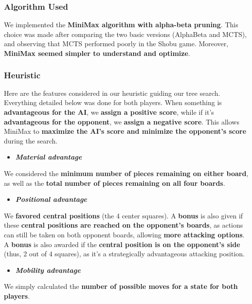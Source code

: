 \documentclass[11pt,a4paper]{report}
\begin{document}
\begin{answers}[21cm]
\subsubsection{Algorithm Used}
We implemented the \textbf{MiniMax algorithm with alpha-beta pruning}. This choice was made after comparing the two basic versions (AlphaBeta and MCTS), and observing that MCTS performed poorly in the Shobu game. Moreover, \textbf{MiniMax seemed simpler to understand and optimize}.

\subsubsection{Heuristic}

Here are the features considered in our heuristic guiding our tree search. Everything detailed below was done for both players. When something is \textbf{advantageous for the AI}, we \textbf{assign a positive score}, while if it's \textbf{advantageous for the opponent}, we \textbf{assign a negative score}. This allows MiniMax to \textbf{maximize the AI's score and minimize the opponent's score} during the search.

\begin{itemize}
    \item \textbf{\textit{Material advantage}}
\end{itemize}
We considered the \textbf{minimum number of pieces remaining on either board}, as well as the \textbf{total number of pieces remaining on all four boards}.

\begin{itemize}
    \item \textbf{\textit{Positional advantage}}
\end{itemize}
We \textbf{favored central positions} (the 4 center squares). A \textbf{bonus} is also given if these \textbf{central positions are reached on the opponent's boards}, as actions can still be taken on both opponent boards, allowing \textbf{more attacking options}. A \textbf{bonus} is also awarded if the \textbf{central position is on the opponent's side} (thus, 2 out of 4 squares), as it's a strategically advantageous attacking position.

\begin{itemize}
    \item \textbf{\textit{Mobility advantage}}
\end{itemize}
We simply calculated the \textbf{number of possible moves for a state for both players}.


\end{answers}
\end{document}
